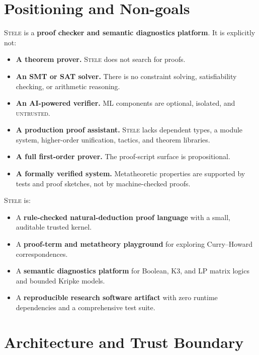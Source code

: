 \documentclass[11pt,a4paper]{article}
\theoremstyle{definition}
\theoremstyle{plain}
\newcommand{\stele}{\textsc{Stele}}
\newcommand{\untrusted}{\textsc{untrusted}}
\begin{document}
\section{Positioning and Non-goals}
\label{sec:positioning}

\stele{} is a \textbf{proof checker and semantic diagnostics
platform}.
It is explicitly not:

\begin{itemize}
  \item \textbf{A theorem prover.}
        \stele{} does not search for proofs.
  \item \textbf{An SMT or SAT solver.}
        There is no constraint solving, satisfiability checking,
        or arithmetic reasoning.
  \item \textbf{An AI-powered verifier.}
        ML components are optional, isolated, and \untrusted{}.
  \item \textbf{A production proof assistant.}
        \stele{} lacks dependent types, a module system,
        higher-order unification, tactics, and theorem libraries.
  \item \textbf{A full first-order prover.}
        The proof-script surface is propositional.
  \item \textbf{A formally verified system.}
        Metatheoretic properties are supported by tests and
        proof sketches, not by machine-checked proofs.
\end{itemize}

\stele{} is:

\begin{itemize}
  \item A \textbf{rule-checked natural-deduction proof language}
        with a small, auditable trusted kernel.
  \item A \textbf{proof-term and metatheory playground} for
        exploring Curry--Howard correspondences.
  \item A \textbf{semantic diagnostics platform} for Boolean,
        K3, and LP matrix logics and bounded Kripke models.
  \item A \textbf{reproducible research software artifact} with
        zero runtime dependencies and a comprehensive test suite.
\end{itemize}

\section{Architecture and Trust Boundary}
\label{sec:arch}
\end{document}
